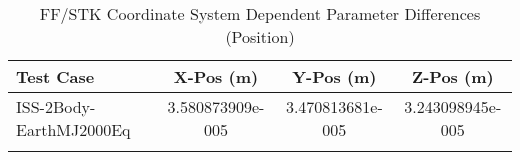 \begin{table}[htbp!]
\centering
\caption{ FF/STK Coordinate System Dependent Parameter Differences (Position)}
      \begin{tabular}{lccc}
      \hline\hline
          Test Case & X-Pos (m) & Y-Pos (m) & Z-Pos (m) \\
         \hline
         ISS-2Body-EarthMJ2000Eq & 3.580873909e-005 & 3.470813681e-005 & 3.243098945e-005 \\
      \hline\hline
      \label{Table: FF-STK CS Parameters Set 1} 
\end{tabular}
\end{table}
